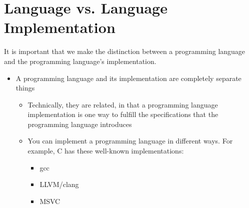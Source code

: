 \section{Language vs. Language Implementation}\label{sec:Lang_vs_Lang_Implementation}
It is important that we make the distinction between a programming language and the programming language's implementation.

\begin{itemize}[noitemsep]
\item A programming language and its implementation are completely separate things
  \begin{itemize}[noitemsep]
  \item Technically, they are related, in that a programming language implementation is one way to fulfill the specifications that the programming language introduces
  \item You can implement a programming language in different ways. For example, C has these well-known implementations:
    \begin{itemize}[noitemsep]
    \item gcc
    \item LLVM/clang
    \item MSVC
    \end{itemize}
  \end{itemize}
\end{itemize}

